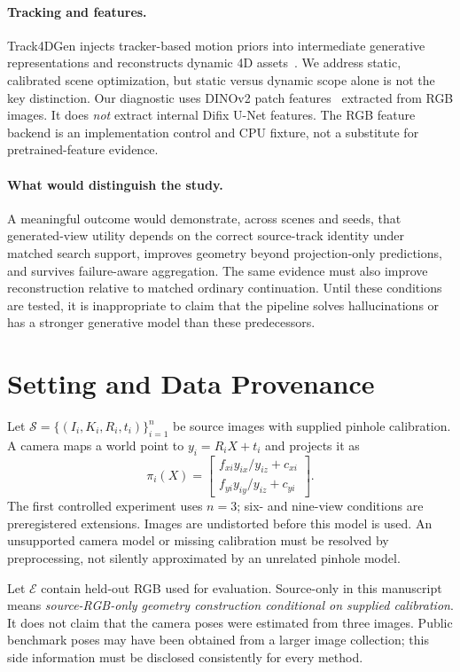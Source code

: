 \documentclass[10pt,twocolumn,letterpaper]{article}
\newcommand{\cS}{\mathcal{S}}
\newcommand{\cE}{\mathcal{E}}
\begin{document}
\paragraph{Tracking and features.} Track4DGen injects tracker-based motion priors into intermediate generative representations and reconstructs dynamic 4D assets~\citep{sun2025track4dgen}. We address static, calibrated scene optimization, but static versus dynamic scope alone is not the key distinction. Our diagnostic uses DINOv2 patch features~\citep{oquab2023dinov2} extracted from RGB images. It does \emph{not} extract internal Difix U-Net features. The RGB feature backend is an implementation control and CPU fixture, not a substitute for pretrained-feature evidence.

\paragraph{What would distinguish the study.} A meaningful outcome would demonstrate, across scenes and seeds, that generated-view utility depends on the correct source-track identity under matched search support, improves geometry beyond projection-only predictions, and survives failure-aware aggregation. The same evidence must also improve reconstruction relative to matched ordinary continuation. Until these conditions are tested, it is inappropriate to claim that the pipeline solves hallucinations or has a stronger generative model than these predecessors.

\section{Setting and Data Provenance}
Let $\cS=\{(I_i,K_i,R_i,t_i)\}_{i=1}^{n}$ be source images with supplied pinhole calibration. A camera maps a world point to $y_i=R_iX+t_i$ and projects it as
\begin{equation}
\pi_i(X)=\begin{bmatrix}f_{xi}y_{ix}/y_{iz}+c_{xi}\\f_{yi}y_{iy}/y_{iz}+c_{yi}\end{bmatrix}.
\end{equation}
The first controlled experiment uses $n=3$; six- and nine-view conditions are preregistered extensions. Images are undistorted before this model is used. An unsupported camera model or missing calibration must be resolved by preprocessing, not silently approximated by an unrelated pinhole model.

Let $\cE$ contain held-out RGB used for evaluation. Source-only in this manuscript means \emph{source-RGB-only geometry construction conditional on supplied calibration}. It does not claim that the camera poses were estimated from three images. Public benchmark poses may have been obtained from a larger image collection; this side information must be disclosed consistently for every method.
\end{document}
